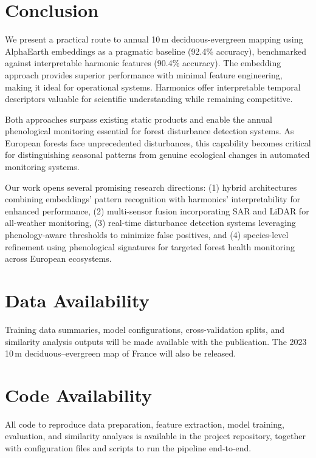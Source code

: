 \documentclass[utf8]{FrontiersinHarvard}
\begin{document}
\section{Conclusion}

We present a practical route to annual 10\,m deciduous-evergreen mapping using AlphaEarth embeddings as a pragmatic baseline (92.4\% accuracy), benchmarked against interpretable harmonic features (90.4\% accuracy). The embedding approach provides superior performance with minimal feature engineering, making it ideal for operational systems. Harmonics offer interpretable temporal descriptors valuable for scientific understanding while remaining competitive.

Both approaches surpass existing static products and enable the annual phenological monitoring essential for forest disturbance detection systems. As European forests face unprecedented disturbances, this capability becomes critical for distinguishing seasonal patterns from genuine ecological changes in automated monitoring systems.

Our work opens several promising research directions: (1) hybrid architectures combining embeddings' pattern recognition with harmonics' interpretability for enhanced performance, (2) multi-sensor fusion incorporating SAR and LiDAR for all-weather monitoring, (3) real-time disturbance detection systems leveraging phenology-aware thresholds to minimize false positives, and (4) species-level refinement using phenological signatures for targeted forest health monitoring across European ecosystems.

\section*{Data Availability}
Training data summaries, model configurations, cross-validation splits, and similarity analysis outputs will be made available with the publication. The 2023 10\,m deciduous–evergreen map of France will also be released.

\section*{Code Availability}
All code to reproduce data preparation, feature extraction, model training, evaluation, and similarity analyses is available in the project repository, together with configuration files and scripts to run the pipeline end‑to‑end.



\end{document}
